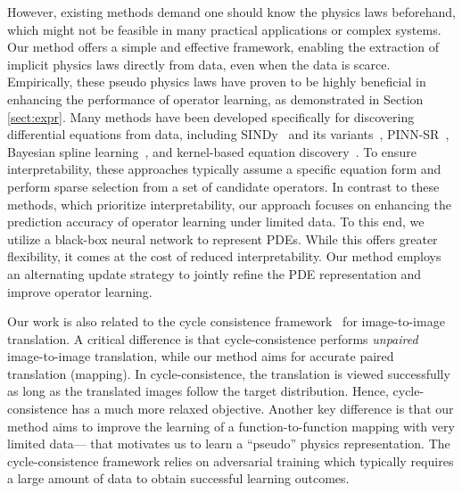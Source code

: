 However, existing methods demand one should know the physics laws beforehand, which might not be feasible in many practical applications or complex systems. Our method offers a simple and effective framework, enabling the extraction of implicit physics laws directly from data, even when the data is scarce. Empirically, these pseudo physics laws have proven to be highly beneficial in enhancing the performance of operator learning, as demonstrated in Section \ref{sect:expr}. Many methods have been developed specifically for discovering differential equations from data, including SINDy~\citep{brunton2016discovering}  and its variants~\citep{schaeffer2017learning,zhang2020data,lagergren2020learning}, PINN-SR~\citep{chen2021physics}, Bayesian spline learning~\citep{sun2022bayesian}, and kernel-based equation discovery~\citep{long2024equation}. To ensure interpretability, these approaches typically assume a specific equation form and perform sparse selection from a set of candidate operators. In contrast to these methods, which prioritize interpretability, our approach focuses on enhancing the prediction accuracy of operator learning under limited data. To this end, we utilize a black-box neural network to represent PDEs. While this offers greater flexibility, it comes at the cost of reduced interpretability. Our method employs an alternating update strategy to jointly refine the PDE representation and improve operator learning.


Our work is also related to the cycle consistence framework~\citep{zhu2017unpaired} for image-to-image translation. A critical difference is that cycle-consistence performs \textit{unpaired} image-to-image translation, while our method aims for accurate paired translation (mapping). In cycle-consistence, the translation is viewed successfully as long as the translated images follow the target distribution. Hence, cycle-consistence has a much more relaxed objective. Another key difference is that our method aims to improve the learning of a function-to-function mapping with very limited data--- that motivates us to learn a ``pseudo'' physics representation. The cycle-consistence framework relies on adversarial training which typically requires a large amount of data to obtain successful learning outcomes.


